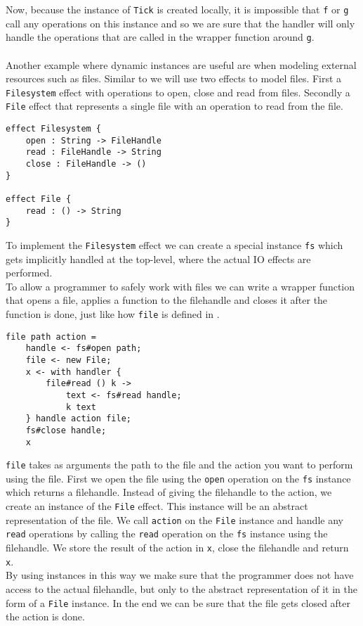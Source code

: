 \documentclass[12pt]{article}
\begin{document}
Now, because the instance of \texttt{Tick} is created locally, it is impossible that \texttt{f} or \texttt{g} call any operations on this instance and so we are sure that the handler will only handle the operations that are called in the wrapper function around \texttt{g}.
\\\\
Another example where dynamic instances are useful are when modeling external resources such as files.
Similar to \cite{kokaresources} we will use two effects to model files.
First a \texttt{Filesystem} effect with operations to open, close and read from files.
Secondly a \texttt{File} effect that represents a single file with an operation to read from the file.
\begin{verbatim}
effect Filesystem {
	open : String -> FileHandle
	read : FileHandle -> String
	close : FileHandle -> ()
}

effect File {
	read : () -> String
}
\end{verbatim}
To implement the \texttt{Filesystem} effect we can create a special instance \texttt{fs} which gets implicitly handled at the top-level, where the actual IO effects are performed.\\
\newpage
To allow a programmer to safely work with files we can write a wrapper function that opens a file, applies a function to the filehandle and closes it after the function is done, just like how \texttt{file} is defined in \cite{kokaresources}.
\begin{verbatim}
file path action =
	handle <- fs#open path;
	file <- new File;
	x <- with handler {
		file#read () k ->
			text <- fs#read handle;
			k text
	} handle action file;
	fs#close handle;
	x
\end{verbatim}
\texttt{file} takes as arguments the path to the file and the action you want to perform using the file.
First we open the file using the \texttt{open} operation on the \texttt{fs} instance which returns a filehandle.
Instead of giving the filehandle to the action, we create an instance of the \texttt{File} effect.
This instance will be an abstract representation of the file.
We call \texttt{action} on the \texttt{File} instance and handle any \texttt{read} operations by calling the \texttt{read} operation on the \texttt{fs} instance using the filehandle.
We store the result of the action in \texttt{x}, close the filehandle and return \texttt{x}.\\
By using instances in this way we make sure that the programmer does not have access to the actual filehandle, but only to the abstract representation of it in the form of a \texttt{File} instance. In the end we can be sure that the file gets closed after the action is done.\\
\end{document}
